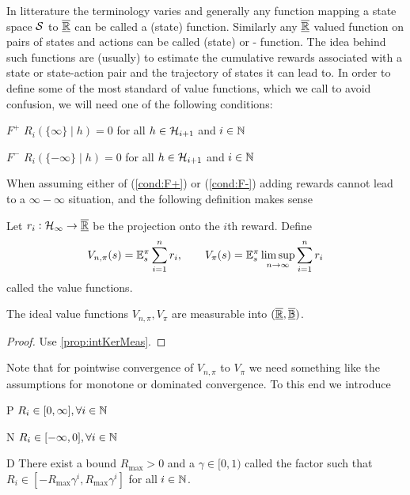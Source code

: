 \documentclass{article}
\begin{document}
In litterature the terminology varies and generally %
any function mapping a state space $\mathcal{S}$ to $\overline{\underline{\mathbb{R}}}$
can be called a (state)
 function. Similarly any $\underline{\overline{\mathbb{R}}}$ valued function
on pairs of states and actions can be called (state)
 or - function.
The idea behind such functions are (usually) to estimate the
cumulative rewards associated with a state or state-action pair
and the trajectory of states it can lead to.
In order to define some of the most standard of value functions,
which we call  to avoid confusion, we will need one of
the following conditions:

\begin{cond}{$F^+$}
  $R_i(\{\infty\} \mid h) = 0$ for all
  $h \in \mathcal{H}_{i+1}$ and $i \in \mathbb{N}$
  \label{cond:F+}
\end{cond}
\begin{cond}{$F^-$}
  $R_i(\{-\infty\} \mid h) = 0$ for all
  $h \in \mathcal{H}_{i+1}$ and $i \in \mathbb{N}$
  \label{cond:F-}
\end{cond}
When assuming either of (\cref{cond:F+}) or (\cref{cond:F-})
adding rewards cannot lead to a $\infty - \infty$ situation,
and the following definition makes sense 
\begin{defn}
  Let $r_i : \mathcal{H}_\infty \to \overline{\underline{\mathbb{R}}}$ be the projection onto the
  $i$th reward. Define
  \[ V_{n,\pi}(s) = \mathbb{E}_s^\pi \sum_{i=1}^n r_i, \qquad
  V_\pi(s) = \mathbb{E}_s^\pi \limsup_{n \to \infty} \sum_{i=1}^n r_i \]
  called the  value functions.
\end{defn}

\begin{prop}
  The ideal value functions $V_{n,\pi}, V_\pi$ are measurable
  into $(\underline{\overline{\mathbb{R}}}, \underline{\overline{\mathbb{B}}})$.
\end{prop}
\begin{proof}  
  Use \cref{prop:intKerMeas}.
\end{proof}

Note that for pointwise convergence of $V_{n, \pi}$ to $V_\pi$
we need something like the assumptions for monotone or dominated convergence.
To this end we introduce 
\begin{cond}{P} $R_i \in [0,\infty], \forall i \in \mathbb{N}$
  \label{cond:P}
\end{cond}
\begin{cond}{N} $R_i \in [-\infty, 0], \forall i \in \mathbb{N}$ 
  \label{cond:N} 
\end{cond}
\begin{cond}{D} There exist a bound $R_{\max} > 0$ and a
  $\gamma \in [0,1)$ called the  factor such that
  $R_i \in [-R_{\max} \gamma^i, R_{\max} \gamma^i]$
  for all $i \in \mathbb{N}$.
  \label{cond:D}
\end{cond}
\end{document}
